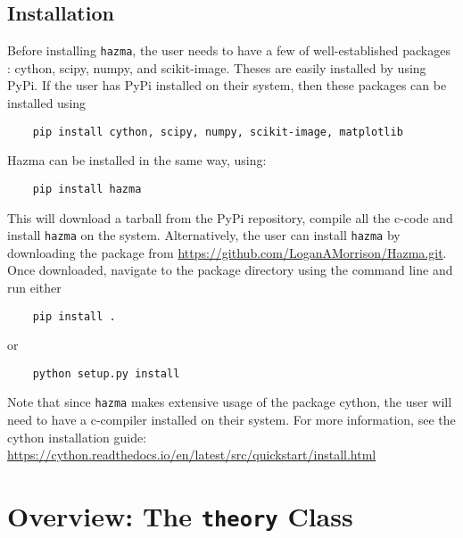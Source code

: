 \documentclass[review]{elsarticle}
\begin{document}
\subsection{Installation}

Before installing \texttt{hazma}, the user needs to have a few of well-established packages : cython, scipy, numpy, and scikit-image. Theses are easily installed by using PyPi. If the user has PyPi installed on their system, then these packages can be installed using
\begin{verbatim}
	pip install cython, scipy, numpy, scikit-image, matplotlib
\end{verbatim}
Hazma can be installed in the same way, using:
\begin{verbatim}
	pip install hazma
\end{verbatim}
This will download a tarball from the PyPi repository, compile all the c-code and install \texttt{hazma} on the system. Alternatively, the user can install \texttt{hazma} by downloading the package from \url{https://github.com/LoganAMorrison/Hazma.git}. Once downloaded, navigate to the package directory using the command line and run either
\begin{verbatim}
	pip install .
\end{verbatim}
or
\begin{verbatim}
	python setup.py install
\end{verbatim}


Note that since \texttt{hazma} makes extensive usage of the package cython, the user will need to have a c-compiler installed on their system. For more information, see the cython installation guide: \url{https://cython.readthedocs.io/en/latest/src/quickstart/install.html}




\section{Overview: The \texttt{theory} Class}%
\label{sec:overview_the_theory_class}


\end{document}
